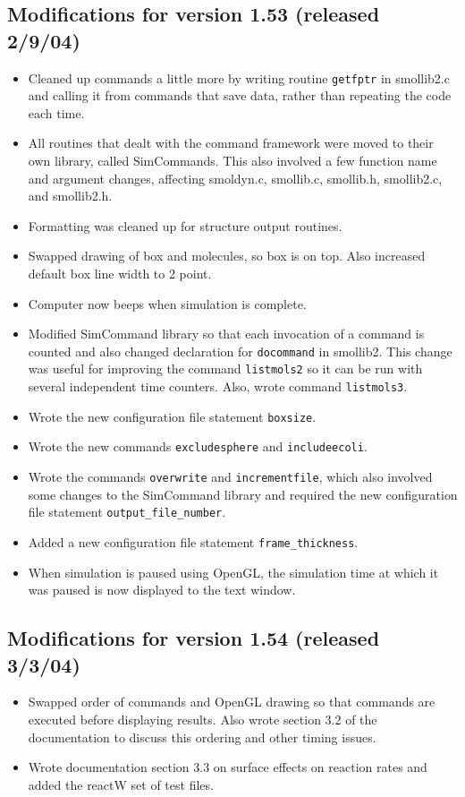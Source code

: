 \documentclass {scrbook}
\newcommand {\ttt} {\texttt}
\begin{document}
\subsection{Modifications for version 1.53 (released 2/9/04)}
\begin{itemize}
\item Cleaned up commands a little more by writing routine \ttt{getfptr} in smollib2.c and calling it from commands that save data, rather than repeating the code each time.
\item All routines that dealt with the command framework were moved to their own library, called SimCommands. This also involved a few function name and argument changes, affecting smoldyn.c, smollib.c, smollib.h, smollib2.c, and smollib2.h.
\item Formatting was cleaned up for structure output routines.
\item Swapped drawing of box and molecules, so box is on top. Also increased default box line width to 2 point.
\item Computer now beeps when simulation is complete.
\item Modified SimCommand library so that each invocation of a command is counted and also changed declaration for \ttt{docommand} in smollib2. This change was useful for improving the command \ttt{listmols2} so it can be run with several independent time counters. Also, wrote command \ttt{listmols3}.
\item Wrote the new configuration file statement \ttt{boxsize}.
\item Wrote the new commands \ttt{excludesphere} and \ttt{includeecoli}.
\item Wrote the commands \ttt{overwrite} and \ttt{incrementfile}, which also involved some changes to the SimCommand library and required the new configuration file statement \ttt{output\_file\_number}.
\item Added a new configuration file statement \ttt{frame\_thickness}.
\item When simulation is paused using OpenGL, the simulation time at which it was paused is now displayed to the text window.
\end{itemize}

\subsection{Modifications for version 1.54 (released 3/3/04)}
\begin{itemize}
\item Swapped order of commands and OpenGL drawing so that commands are executed before displaying results. Also wrote section 3.2 of the documentation to discuss this ordering and other timing issues.
\item Wrote documentation section 3.3 on surface effects on reaction rates and added the reactW set of test files.
\end{itemize}
\end{document}
